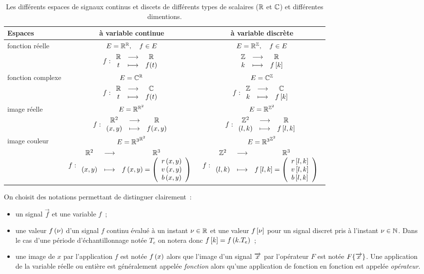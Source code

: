 \begin{table}[!ht]
  \begin{tabular}{p{}|c|c}
   Espaces  & à variable continue    & à variable discrète  \\\hline
    fonction réelle & $E=\R^\R,\quad f\in E $  &  $E=\R^\Z,\quad f\in E $   \\
            & $ f:\application{\R}{\R}{t}{f(t)} $   &  $\application{\Z}{\R}{k}{f\b{k}} $   \\
    \hline
        fonction complexe & $E=\C^\R$   &    $E=\C^\Z$  \\
    & $f:\application{\R}{\C}{t}{f(t)} $   &    $f:\application{\Z}{\C}{k}{f\b{k}} $     \\
    \hline
        image réelle & $E=\R^{\R^2}$   &   $E=\R^{\Z^2}$\\     
    & $f:\application{\R^2}{\R}{\p{x,y}}{f(x,y)} $   &   $f:\application{\Z^2}{\R}{\p{l,k}}{f\b{l,k}}$      \\
    \hline
       image  couleur & $E={\R^3}^{\R^2}$   &   $E={\R^3}^{\Z^2}$      \\
    & $f:\application{\R^2}{\R^3}{\p{x,y}}{f\p{x,y}=\vvvect{r\p{x,y}}{v\p{x,y}}{b\p{x,y}}} $   &   $f:\application{\Z^2}{\R^3}{\p{l,k}}{f\b{l,k}=\vvvect{r\b{l,k}}{v\b{l,k}}{b\b{l,k}}}$      \\
\hline
  \end{tabular}
  \caption{Les différents espaces de signaux continus et discets de différents types de scalaires ($\R$ et $\C$) et différentes dimentions.}
  \label{tab:espaces_signaux}
\end{table}

\begin{remarque}
  On choisit des notations permettant de distinguer clairement~:
  \begin{itemize}
  \item un signal $\vec{f}$  et une variable $f$~;
  \item une valeur $f\p{\nu}$ d'un signal $f$ continu évalué à un instant $\nu\in\R$ et une valeur $f\b{\nu}$ pour un signal discret pris à l'instant $\nu\in\N$. Dans le cas d'une période d'échantillonnage notée $T_e$ on notera donc $f\b{k}=f\p{k.T_e}$~;
   \item une image de $x$ par l'application $f$ est notée $f\p{x}$ alors que l'image d'un signal $\x$ par l'opérateur $F$ est notée $F\OperDe{\x}$. Une application de la variable réelle ou entière est généralement appelée \emph{fonction} alors qu'une application de fonction en fonction est appelée \emph{opérateur}. 
  \end{itemize}
\end{remarque}
